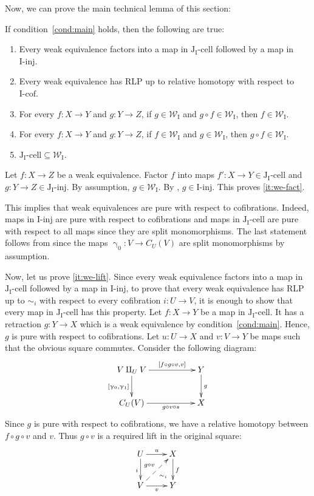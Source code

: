 \documentclass{tac}
\theoremstyle{definition}
\newcommand{\we}{\mathcal{W}}
\newcommand{\I}{\mathrm{I}}
\newcommand{\J}{\mathrm{J}}
\newcommand{\class}[2]{#1\text{-}\mathrm{#2}}
\newcommand{\Iinj}[1][\I]{\class{#1}{inj}}
\newcommand{\Icell}[1][\I]{\class{#1}{cell}}
\newcommand{\Icof}[1][\I]{\class{#1}{cof}}
\newcommand{\Jinj}[1][]{\Iinj[\J#1]}
\newcommand{\Jcell}[1][]{\Icell[\J#1]}
\newcommand{\cyli}{\upgamma}
\begin{document}
Now, we can prove the main technical lemma of this section:

\begin{lem}[main]
If condition~\eqref{cond:main} holds, then the following are true:
\begin{enumerate}
\item \label{it:we-fact} Every weak equivalence factors into a map in $\Jcell[_\I]$ followed by a map in $\Iinj$.
\item \label{it:we-lift} Every weak equivalence has RLP up to relative homotopy with respect to $\Icof$.
\item \label{it:we-top} For every $f : X \to Y$ and $g : Y \to Z$, if $g \in \we_\I$ and $g \circ f \in \we_\I$, then $f \in \we_\I$.
\item For every $f : X \to Y$ and $g : Y \to Z$, if $f \in \we_\I$ and $g \in \we_\I$, then $g \circ f \in \we_\I$.
\item $\Jcell[_\I] \subseteq \we_\I$.
\end{enumerate}
\end{lem}
\proof
Let $f : X \to Z$ be a weak equivalence.
Factor $f$ into maps $f' : X \to Y \in \Jcell[_\I]$ and $g : Y \to Z \in \Jinj[_\I]$.
By assumption, $g \in \we_\I$.
By , $g \in \Iinj$.
This proves \eqref{it:we-fact}.

This implies that weak equivalences are pure with respect to cofibrations.
Indeed, maps in $\Iinj$ are pure with respect to cofibrations and maps in $\Jcell[_\I]$ are pure with respect to all maps since they are split monomorphisms.
The last statement follows from  since the maps $\cyli_0 : V \to C_U(V)$ are split monomorphisms by assumption.

Now, let us prove \eqref{it:we-lift}.
Since every weak equivalence factors into a map in $\Jcell[_\I]$ followed by a map in $\Iinj$,
to prove that every weak equivalence has RLP up to $\sim_i$ with respect to every cofibration $i : U \to V$,
it is enough to show that every map in $\Jcell[_\I]$ has this property.
Let $f : X \to Y$ be a map in $\Jcell[_\I]$.
It has a retraction $g : Y \to X$ which is a weak equivalence by condition~\eqref{cond:main}.
Hence, $g$ is pure with respect to cofibrations.
Let $u : U \to X$ and $v : V \to Y$ be maps such that the obvious square commutes.
Consider the following diagram:
\[ \xymatrix{ V \amalg_U V \ar[rr]^-{[f \circ g \circ v, v]} \ar[d]_{[\cyli_0,\cyli_1]} & & Y \ar[d]^g \\
              C_U(V) \ar[rr]_-{g \circ v \circ s} & & X
            } \]
Since $g$ is pure with respect to cofibrations, we have a relative homotopy between $f \circ g \circ v$ and $v$.
Thus $g \circ v$ is a required lift in the original square:
\[ \xymatrix{ U \ar[r]^u \ar[d]_i \ar@{}[dr]|(.7){\sim_i}   & X \ar[d]^f \\
              V \ar[r]_v \ar@{-->}[ur]^{g \circ v}          & Y
            } \]
\end{document}

